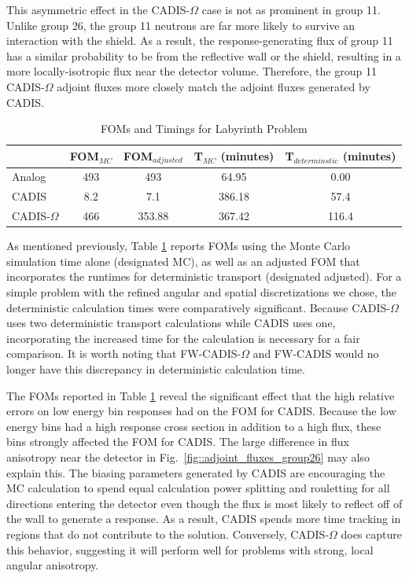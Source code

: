 \documentclass[12pt]{article}
\begin{document}
This asymmetric effect in the CADIS-$\Omega$ case is not as prominent in group 11. 
Unlike group 26, the group 11 neutrons are far more likely to survive an interaction with the shield. As a result, the response-generating flux of group 11 has a similar probability to be from the reflective wall or the shield, resulting in a more locally-isotropic flux near the detector volume. Therefore, the group 11 CADIS-$\Omega$ adjoint fluxes more closely match the adjoint fluxes generated by CADIS. 

 \begin{table}
  \centering
  \caption{\label{tab:FOMLabI}FOMs and Timings for Labyrinth Problem}
  \begin{tabular}{l|cc|cc}
    \toprule
        & FOM$_{MC}$ & FOM$_{adjusted}$ & T$_{MC}$ (minutes) & T$_{determinstic}$ (minutes) \\
    \hline
    Analog           & 493   &  493     & 64.95      & 0.00 \\ 
    CADIS            & 8.2   &  7.1     & 386.18     & 57.4  \\
    CADIS-$\Omega$   & 466   &  353.88  & 367.42     & 116.4  \\  
	\bottomrule
  \end{tabular}
\end{table}

As mentioned previously, Table \ref{tab:FOMLabI} reports FOMs using the Monte Carlo simulation time alone (designated MC), as well as an adjusted FOM that incorporates the runtimes for deterministic transport (designated adjusted). For a simple problem with the refined angular and spatial discretizations we chose, the deterministic calculation times were comparatively significant.
Because CADIS-$\Omega$ uses two deterministic transport calculations while CADIS uses one, incorporating the increased time for the calculation is necessary for a fair comparison.
It is worth noting that FW-CADIS-$\Omega$ and FW-CADIS would no longer have this discrepancy in deterministic calculation time.

The FOMs reported in Table \ref{tab:FOMLabI} reveal the significant effect that the high relative errors on low energy bin responses had on the FOM for CADIS. Because the low energy bins had a high response cross section in addition to a high flux, these bins strongly affected the FOM for CADIS. The large difference in flux anisotropy near the detector in Fig.~\ref{fig::adjoint_fluxes_group26} may also explain this. The biasing parameters generated by CADIS are encouraging the MC calculation to spend equal calculation power splitting and rouletting for all directions entering the detector even though the flux is most likely to reflect off of the wall to generate a response. As a result, CADIS spends more time tracking in regions that do not contribute to the solution. Conversely, CADIS-$\Omega$ does capture this behavior, suggesting it will perform well for problems with strong, local angular anisotropy.  
\end{document}
